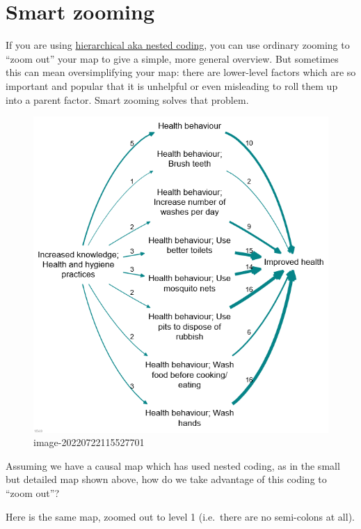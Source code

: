 \documentclass[
]{book}
\begin{document}
\hypertarget{smart-zoom}{%
\chapter{Smart zooming}\label{smart-zoom}}

If you are using \protect\hyperlink{xsimplifying-with-hierarchical}{hierarchical aka nested coding}, you can use ordinary zooming to ``zoom out'' your map to give a simple, more general overview. But sometimes this can mean oversimplifying your map: there are lower-level factors which are so important and popular that it is unhelpful or even misleading to roll them up into a parent factor. Smart zooming solves that problem.

\begin{figure}
\centering
\includegraphics[width=6.77083in,height=\textheight]{_assets/image-20220722115527701.png}
\caption{image-20220722115527701}
\end{figure}

Assuming we have a causal map which has used nested coding, as in the small but detailed map shown above, how do we take advantage of this coding to ``zoom out''?

Here is the same map, zoomed out to level 1 (i.e.~there are no semi-colons at all).
\end{document}
